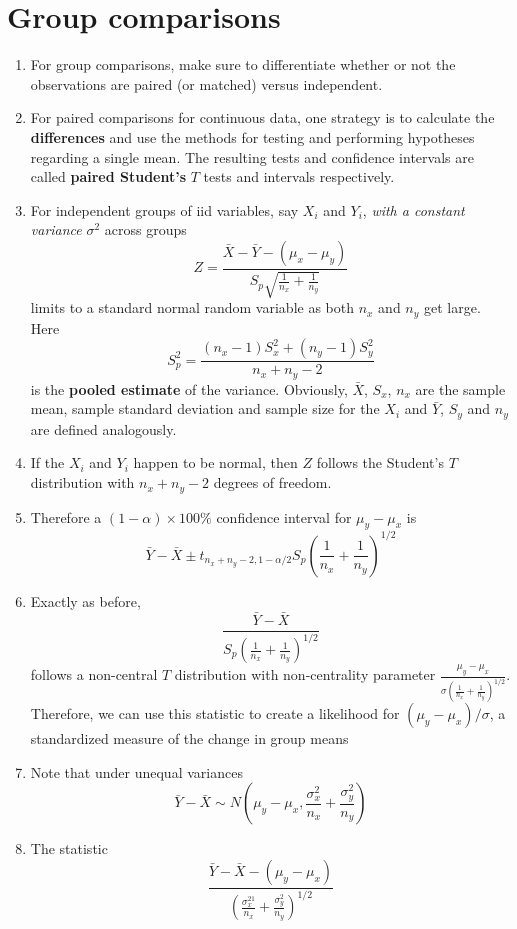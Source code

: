 \documentclass[12pt]{article}
\begin{document}
\section{Group comparisons}
\begin{enumerate}[1.]
\item For group comparisons, make sure to differentiate whether or not the
  observations are paired (or matched) versus independent.
\item For paired comparisons for continuous data, one strategy is to
  calculate the {\bf differences} and use the methods for testing and
  performing hypotheses regarding a single mean. The resulting tests
  and confidence intervals are called {\bf paired Student's} $T$ tests
  and intervals respectively.
\item For independent groups of iid variables, say $X_i$ and $Y_i$,
  {\em with a constant variance} $\sigma^2$ across groups
  $$
  Z = \frac{\bar X - \bar Y - (\mu_x - \mu_y)}{S_p \sqrt{\frac{1}{n_x} +
      \frac{1}{n_y}}}
  $$
  limits to a standard normal random variable as both $n_x$ and
  $n_y$ get large. Here 
  $$S_p^2 = \frac{(n_x - 1) S_x^2 + (n_y - 1) S_y^2}{n_x + n_y - 2}$$
  is the {\bf pooled estimate} of the variance.  Obviously, $\bar X$,
  $S_x$, $n_x$ are the sample mean, sample standard deviation and
  sample size for the $X_i$ and $\bar Y$, $S_y$ and $n_y$ are defined
  analogously. 
\item If the $X_i$ and $Y_i$ happen to be normal, then $Z$ follows the
  Student's $T$ distribution with $n_x + n_y - 2$ degrees of freedom.
\item Therefore a $(1 - \alpha)\times 100\%$ confidence interval for
  $\mu_y - \mu_x$ is 
  $$
  \bar Y - \bar X \pm t_{n_x + n_y - 2, 1 - \alpha/2}S_p\left(\frac{1}{n_x} + \frac{1}{n_y}\right)^{1/2}
  $$
\item Exactly as before, 
$$
\frac{\bar Y - \bar X}{S_p \left(\frac{1}{n_x} + \frac{1}{n_y}\right)^{1/2}}
$$
follows a non-central $T$ distribution with non-centrality parameter
$\frac{\mu_y - \mu_x}{\sigma \left(\frac{1}{n_x} +
    \frac{1}{n_y}\right)^{1/2}}$. Therefore, we can use this statistic
to create a likelihood for $(\mu_y - \mu_x) / \sigma$, a standardized
measure of the change in group means
\item Note that under unequal variances
$$
\bar Y - \bar X \sim N\left(\mu_y - \mu_x, \frac{\sigma_x^2}{n_x} + \frac{\sigma_y^2}{n_y}\right)
$$
\item The statistic 
$$
\frac{\bar Y - \bar X - (\mu_y - \mu_x)}{\left(\frac{\sigma_x^21}{n_x} + \frac{\sigma_y^2}{n_y}\right)^{1/2}}
$$
\end{enumerate}
\end{document}
